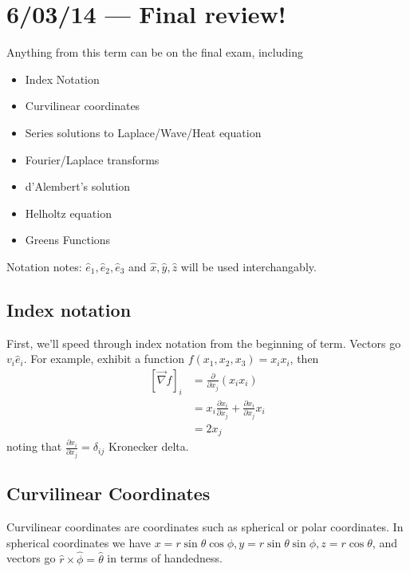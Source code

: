 \documentclass[12pt]{article}
\newcommand{\pd}[2]{\frac{\partial#1}{\partial#2}}
\begin{document}
\cfoot{\thepage/\pageref{LastPage}}

\section{6/03/14 --- Final review!}

Anything from this term can be on the final exam, including
\begin{itemize}
    \item Index Notation
    \item Curvilinear coordinates
    \item Series solutions to Laplace/Wave/Heat equation
    \item Fourier/Laplace transforms
    \item d'Alembert's solution
    \item Helholtz equation
    \item Greens Functions
\end{itemize}

Notation notes: $\hat{e}_1, \hat{e}_2, \hat{e}_3$ and $\hat{x}, \hat{y}, \hat{z}$ will be used interchangably.

\subsection{Index notation}
First, we'll speed through index notation from the beginning of term. Vectors go $v_i\hat{e}_i$. For example, exhibit a function $f(x_1, x_2, x_3) = x_ix_i$, then 
\begin{align}
    \left[ \vec{\nabla}f \right]_i &= \pd{}{x_j}\left( x_i x_i \right)\\
    &= x_i\pd{x_i}{x_j} + \pd{x_i}{x_j}x_i\\
    &= 2x_j
\end{align}
noting that $\pd{x_i}{x_j} = \delta_{ij}$ Kronecker delta.

\subsection{Curvilinear Coordinates}
Curvilinear coordinates are coordinates such as spherical or polar coordinates. In spherical coordinates we have $x = r\sin\theta\cos\phi, y = r\sin\theta\sin\phi, z = r\cos\theta$, and vectors go $\hat{r} \times \hat{\phi} = \hat{\theta}$ in terms of handedness.
\end{document}
